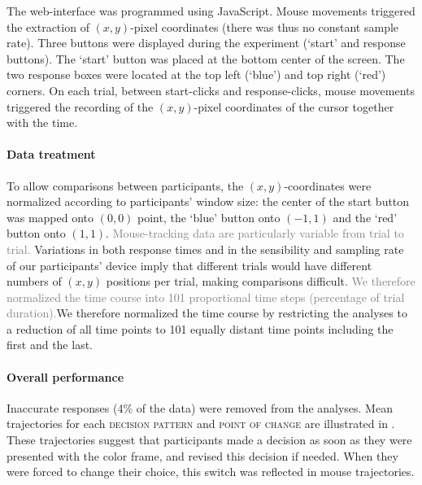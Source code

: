 \documentclass[draft]{article}
\newcommand{\changeEC}[2]{{\footnotesize\textcolor{gray}{#1}}\textcolor{blue}{#2}}
\newcommand{\nbEC}[1]{{\leavevmode\color{blue}{\scriptsize#1}}}
\newcommand{\addEC}[1]{{\leavevmode\color{blue}#1}}
\begin{document}
\addEC{The web-interface was programmed using JavaScript. Mouse movements triggered the extraction of $(x,y)$-pixel coordinates (there was thus no constant sample rate).
Three buttons were displayed during the experiment (`start' and response buttons). The `start' button was placed at the bottom center of the screen. The two response boxes were located at the top left (`blue') and top right (`red') corners. 
On each trial, between start-clicks and response-clicks, mouse movements triggered the recording of the $(x,y)$-pixel coordinates of the cursor together with the time. }


\paragraph{Data treatment}
To allow comparisons between participants, the $(x,y)$-coordinates were normalized according to participants' window size: the center of the start button was mapped onto $(0,0)$ point, the `blue' button onto $(-1,1)$ and the `red' button onto $(1,1)$. 
\changeEC{Mouse-tracking data are particularly variable from trial to trial. }{}
Variations in both response times and in the sensibility and sampling rate of our participants' device imply that different trials would have different numbers of $(x,y)$ positions per trial, making comparisons difficult. %
\changeEC{We therefore normalized the time course into 101 proportional time steps (percentage of trial duration).}{\nbEC{not sufficient information? Maybe: }}{We therefore normalized the time course by restricting the analyses to a reduction of all time points to 101 equally distant time points including the first and the last.}

\paragraph{Overall performance}
Inaccurate responses (4\% of the data) were removed from the analyses. 
Mean trajectories for each \textsc{decision pattern} and \textsc{point of change} are illustrated in . 
These trajectories suggest that participants made a decision as soon as they were presented with the color frame, and revised this decision if needed. When they were forced to change their choice, this switch was reflected in mouse trajectories. 
\end{document}
